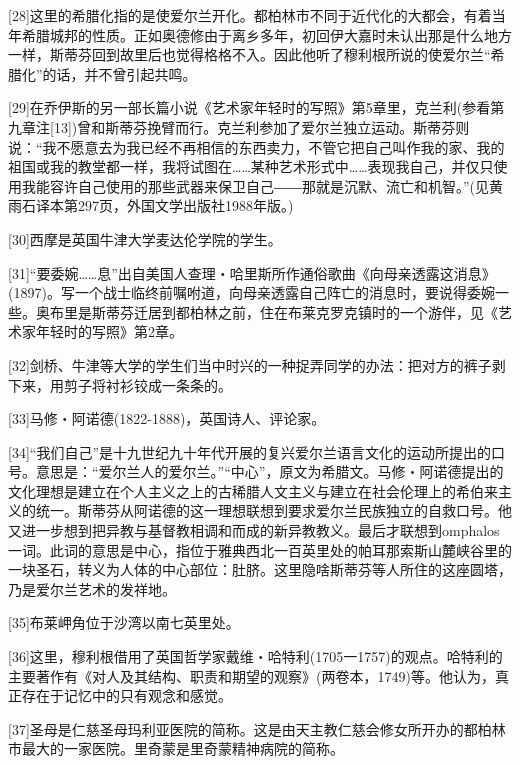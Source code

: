 \documentclass{article}
\begin{document}
[28]这里的希腊化指的是使爱尔兰开化。都柏林市不同于近代化的大都会，有着当年希腊城邦的性质。正如奥德修由于离乡多年，初回伊大嘉时未认出那是什么地方一样，斯蒂芬回到故里后也觉得格格不入。因此他听了穆利根所说的使爱尔兰“希腊化”的话，并不曾引起共鸣。



[29]在乔伊斯的另一部长篇小说《艺术家年轻时的写照》第5章里，克兰利(参看第九章注[13])曾和斯蒂芬挽臂而行。克兰利参加了爱尔兰独立运动。斯蒂芬则说：“我不愿意去为我已经不再相信的东西卖力，不管它把自己叫作我的家、我的祖国或我的教堂都一样，我将试图在……某种艺术形式中……表现我自己，并仅只使用我能容许自己使用的那些武器来保卫自己――那就是沉默、流亡和机智。”(见黄雨石译本第297页，外国文学出版社1988年版。)



[30]西摩是英国牛津大学麦达伦学院的学生。



[31]“要委婉……息”出自美国人查理・哈里斯所作通俗歌曲《向母亲透露这消息》(1897)。写一个战士临终前嘱咐道，向母亲透露自己阵亡的消息时，要说得委婉一些。奥布里是斯蒂芬迁居到都柏林之前，住在布莱克罗克镇时的一个游伴，见《艺术家年轻时的写照》第2章。



[32]剑桥、牛津等大学的学生们当中时兴的一种捉弄同学的办法：把对方的裤子剥下来，用剪子将衬衫铰成一条条的。



[33]马修・阿诺德(1822-1888)，英国诗人、评论家。



[34]“我们自己”是十九世纪九十年代开展的复兴爱尔兰语言文化的运动所提出的口号。意思是：“爱尔兰人的爱尔兰。”“中心”，原文为希腊文。马修・阿诺德提出的文化理想是建立在个人主义之上的古稀腊人文主义与建立在社会伦理上的希伯来主义的统一。斯蒂芬从阿诺德的这一理想联想到要求爱尔兰民族独立的自救口号。他又进一步想到把异教与基督教相调和而成的新异教教义。最后才联想到omphalos一词。此词的意思是中心，指位于雅典西北一百英里处的帕耳那索斯山麓峡谷里的一块圣石，转义为人体的中心部位：肚脐。这里隐啥斯蒂芬等人所住的这座圆塔，乃是爱尔兰艺术的发祥地。



[35]布莱岬角位于沙湾以南七英里处。



[36]这里，穆利根借用了英国哲学家戴维・哈特利(1705一1757)的观点。哈特利的主要著作有《对人及其结构、职责和期望的观察》(两卷本，1749)等。他认为，真正存在于记忆中的只有观念和感觉。



[37]圣母是仁慈圣母玛利亚医院的简称。这是由天主教仁慈会修女所开办的都柏林市最大的一家医院。里奇蒙是里奇蒙精神病院的简称。
\end{document}
